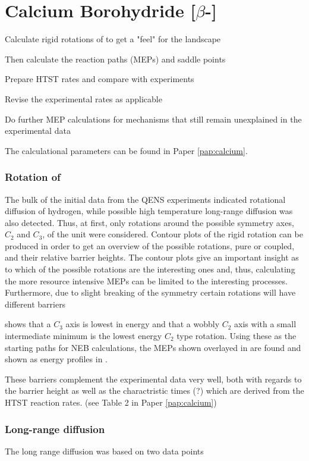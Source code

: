 \section{Calcium Borohydride [$\beta$-]}
\label{sec:borohydrides-calcium}

\bit
\item Calculate rigid rotations of  to get a "feel" for the landscape
\item Then calculate the reaction paths (MEPs) and saddle points
\item Prepare HTST rates and compare with experiments
\item Revise the experimental rates as applicable
\item Do further MEP calculations for mechanisms that still remain unexplained in the experimental data
\eit

The calculational parameters can be found in Paper \ref{pap:calcium}.

\subsubsection{Rotation of }
The bulk of the initial data from the QENS experiments indicated rotational diffusion of hydrogen, while possible high temperature long-range diffusion was also detected.
Thus, at first, only rotations around the possible symmetry axes, $C_2$ and $C_3$, of the  unit were considered.
Contour plots of the rigid rotation can be produced in order to get an overview of the possible rotations, pure or coupled, and their relative barrier heights.
The contour plots give an important insight as to which of the possible rotations are the interesting ones and, thus, calculating the more resource intensive MEPs can be limited to the interesting processes.
Furthermore, due to slight breaking of the symmetry certain rotations will have different barriers \expand

 shows that a $C_3$ axis is lowest in energy and that a wobbly $C_2$ axis with a small intermediate minimum is the lowest energy $C_2$ type rotation.
Using these as the starting paths for NEB calculations, the MEPs shown overlayed in  are found and shown as energy profiles in .

These barriers complement the experimental data very well, both with regards to the barrier height as well as the charactristic times (?) which are derived from the HTST reaction rates. (see Table 2 in Paper \ref{pap:calcium})

\subsubsection{Long-range diffusion \pending}

The long range diffusion was based on two data points 

\incomplete

